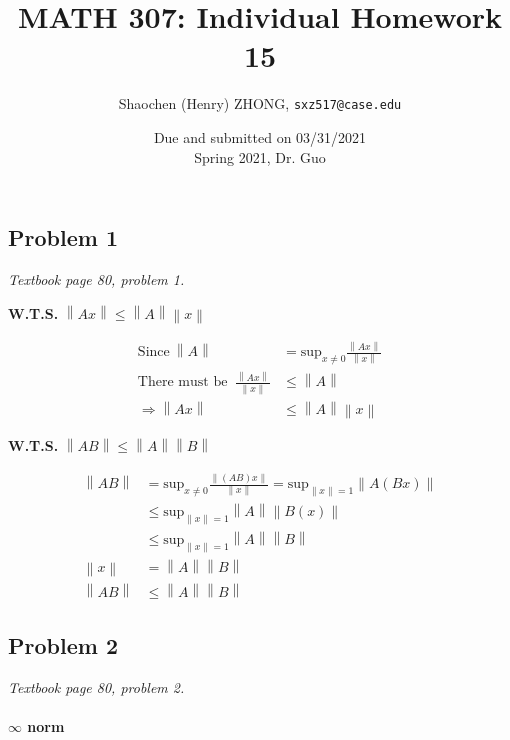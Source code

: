 \documentclass[11pt]{article}
\newcommand{\ilc}{\texttt}
\providecommand{\norm}[1]{\left\lVert #1 \right\rVert}
\begin{document}
\title{\textbf{MATH 307: Individual Homework 15}}


\author{Shaochen (Henry) ZHONG, \ilc{sxz517@case.edu}}

\date{Due and submitted on 03/31/2021 \\ Spring 2021, Dr. Guo}
\maketitle



\subsection*{Problem 1}
\textit{Textbook page 80, problem 1.}\newline

\textbf{W.T.S.} $\norm{Ax} \leq \norm{A} \norm{x}$

\begin{align*}
    \text{Since} \ \norm{A} &= \text{sup}_{x \neq 0} \frac{\norm{Ax}}{\norm{x}} \\
    \text{There must be } \ \frac{\norm{Ax}}{\norm{x}} &\leq \norm{A} \\
    \Longrightarrow \norm{Ax} &\leq \norm{A}\norm{x}
\end{align*}

\textbf{W.T.S.} $\norm{AB} \leq \norm{A} \norm{B}$

\begin{align*}
    \norm{AB} &= \text{sup}_{x \neq 0} \frac{\norm{(AB)x}}{\norm{x}}= \text{sup}_{\norm{x} = 1}  \norm{A(Bx)} \\
    &\leq \text{sup}_{\norm{x} = 1} \norm{A} \norm{B(x)} \\
    &\leq \text{sup}_{\norm{x} = 1} \norm{A} \norm{B} \\ \norm{x} &= \norm{A} \norm{B} \\
    \norm{AB} &\leq \norm{A} \norm{B}
\end{align*}



\subsection*{Problem 2}
\textit{Textbook page 80, problem 2.}\newline

\paragraph*{$\infty$ norm}
\end{document}
